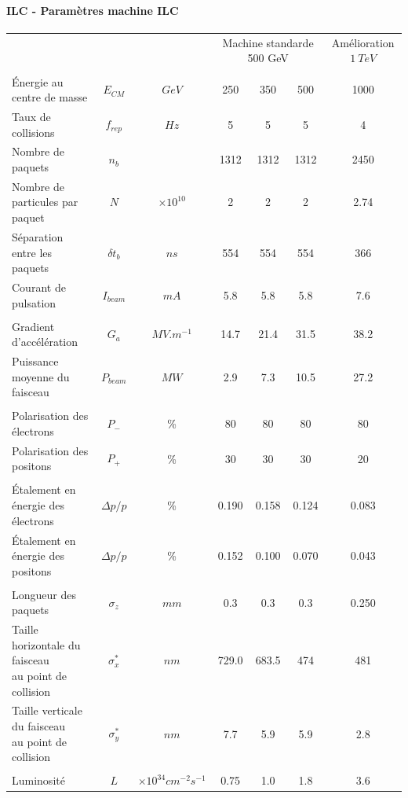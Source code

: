 \documentclass[8pt]{beamer}
\begin{document}
  \begin{frame}
  \frametitle{\backup}
  \framesubtitle{ILC - Paramètres machine ILC}
  \footnotesize
    \begin{center}
      \begin{tabular}{l c c c c c c}
        ~ & ~ & ~ & \multicolumn{3}{c}{Machine standarde 500 GeV} & Amélioration $1~TeV$ \\ \\

        Énergie au centre de masse & $E_{CM}$ & $GeV$ & 250 & 350 & 500 & 1000 \\ \hline
        Taux de collisions & $f_{rep}$ & $Hz$ & 5 & 5 & 5 & 4 \\
        Nombre de paquets & $n_b$ & ~ & 1312 & 1312 & 1312 & 2450 \\
        Nombre de particules par paquet & $N$ & $\times10^{10}$ & 2 & 2 & 2 & 2.74 \\
        Séparation entre les paquets & $\delta t_b$ & $ns$ & 554 & 554 & 554 & 366 \\
        Courant de pulsation & $I_{beam}$ & $mA$ & 5.8 & 5.8 & 5.8 & 7.6 \\ \\

        Gradient d'accélération & $G_a$ & $MV.m^{-1}$ & 14.7 & 21.4 & 31.5 & 38.2 \\
        Puissance moyenne du faisceau & $P_{beam}$ & $MW$ & 2.9 & 7.3 & 10.5 & 27.2 \\ \\

        Polarisation des électrons & $P_-$ & \% & 80 & 80 & 80 & 80 \\
        Polarisation des positons & $P_+$ & \% & 30 & 30 & 30 & 20 \\ \\

        Étalement en énergie des électrons  & $\Delta p/p$ & \% & 0.190 & 0.158 & 0.124 & 0.083 \\
        Étalement en énergie des positons  & $\Delta p/p$ & \% & 0.152 & 0.100 & 0.070 & 0.043 \\ \\

        Longueur des paquets & $\sigma_z$ & $mm$ & 0.3 & 0.3 & 0.3 & 0.250 \\
        \makecell[l]{Taille horizontale du faisceau \\ au point de collision} & $\sigma_x^*$ & $nm$ & 729.0 & 683.5 & 474 & 481 \\
        \makecell[l]{Taille verticale du faisceau \\ au point de collision} & $\sigma_y^*$ & $nm$ & 7.7 & 5.9 & 5.9 & 2.8 \\ \\

        Luminosité & $L$ & $\times10^{34}cm^{-2}s^{-1}$ & 0.75 & 1.0 & 1.8 & 3.6
      \end{tabular}
    \end{center}
  \end{frame}
\end{document}
